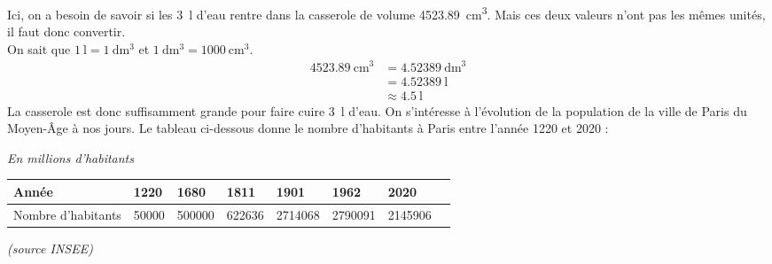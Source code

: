 \documentclass[../Cours.tex]{subfiles}
\begin{document}
\begin{questions}
        {\color{rouge}
            Ici, on a besoin de savoir si les \qty{3}{\litre} d'eau rentre dans la casserole de volume \qty{4523.89}{\centi\metre\cubed}. Mais ces deux valeurs n'ont pas les mêmes unités, il faut donc convertir.\\
            On sait que $\qty{1}{\litre} = \qty{1}{\deci\metre\cubed}$ et $\qty{1}{\deci\metre\cubed} = \qty{1000}{\centi\metre\cubed}$.\\
            \begin{align*}
                \qty{4523.89}{\centi\metre\cubed} &= \qty{4.52389}{\deci\metre\cubed} \\
                &= \qty{4.52389}{\litre}\\
                &\approx \qty{4.5}{\litre}
            \end{align*}
            La casserole est donc suffisamment grande pour faire cuire \qty{3}{\litre} d'eau.
        }
    \clearpage
    On s'intéresse à l'évolution de la population de la ville de Paris du Moyen-Âge à nos jours. Le tableau ci-dessous donne le nombre d'habitants à Paris entre l'année 1220 et 2020 :
    \begin{center}
        \begin{flushright}
            \textit{En millions d'habitants}
        \end{flushright}
        \begin{tabularx}{0.9\linewidth}{|l|X|X|X|X|X|X|X|}\hline
            Année & 1220 & 1680 & 1811 & 1901 & 1962 & 2020  \\\hline
            Nombre d'habitants & \num{50000} & \num{500000} & \num{622636} & \num{2714068} & \num{2790091} & \num{2145906} \\\hline
        \end{tabularx}
        \begin{flushright}\vspace{-0.8em}
            \textit{(source INSEE)}
        \end{flushright}
    \end{center}


\end{questions}
\end{document}
